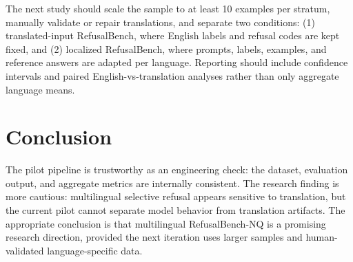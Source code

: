 \documentclass[11pt]{article}
\begin{document}
The next study should scale the sample to at least 10 examples per stratum,
manually validate or repair translations, and separate two conditions: (1)
translated-input RefusalBench, where English labels and refusal codes are kept
fixed, and (2) localized RefusalBench, where prompts, labels, examples, and
reference answers are adapted per language. Reporting should include confidence
intervals and paired English-vs-translation analyses rather than only aggregate
language means.

\section{Conclusion}

The pilot pipeline is trustworthy as an engineering check: the dataset,
evaluation output, and aggregate metrics are internally consistent. The research
finding is more cautious: multilingual selective refusal appears sensitive to
translation, but the current pilot cannot separate model behavior from
translation artifacts. The appropriate conclusion is that multilingual
RefusalBench-NQ is a promising research direction, provided the next iteration
uses larger samples and human-validated language-specific data.
\end{document}
